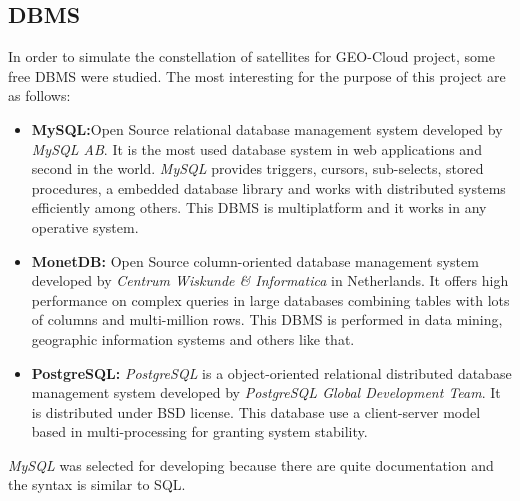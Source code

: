\subsection{DBMS}

In order to simulate the constellation of satellites for GEO-Cloud project, some
free \ac{DBMS} were studied. The most interesting for the purpose of this project are
as follows:
\begin{itemize}
\item \textbf{MySQL:}Open Source relational database management system developed by
  \emph{MySQL AB}. It is the most used database system in web applications and
  second in the world. \emph{MySQL} provides triggers, cursors, sub-selects, stored
  procedures, a embedded database library and works with distributed systems
  efficiently among others. This \ac{DBMS} is multiplatform and it works in any
  operative system. 
\item \textbf{MonetDB:} Open Source column-oriented database management system
  developed by \emph{Centrum Wiskunde \& Informatica} in Netherlands. It offers
  high performance on complex queries in large databases combining tables with
  lots of columns and multi-million rows. This \ac{DBMS} is performed in data
  mining, geographic information systems and others like that.
\item \textbf{PostgreSQL:} \emph{PostgreSQL} is a object-oriented relational
  distributed database management system developed by \emph{PostgreSQL Global
    Development Team}. It is distributed under \ac{BSD} license. This database use a
  client-server model based in multi-processing for granting system stability.
\end{itemize} 

\emph{MySQL} was selected for developing because there are quite documentation and the
syntax is similar to \ac{SQL}.

